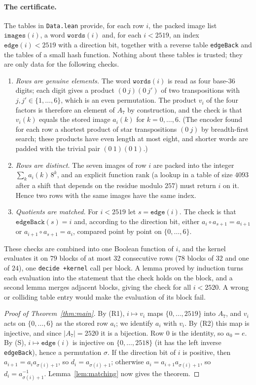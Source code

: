 \documentclass[11pt]{article}
\theoremstyle{definition}
\theoremstyle{remark}
\newcommand{\Alt}{A_7}
\begin{document}
\paragraph{The certificate.}
The tables in \texttt{Data.lean} provide, for each row $i$, the packed image
list $\mathtt{images}(i)$, a word $\mathtt{words}(i)$ and, for each $i<2519$,
an index $\mathtt{edge}(i)<2519$ with a direction bit, together with a reverse
table \texttt{edgeBack} and the tables of a small hash function. Nothing about
these tables is trusted; they are only data for the following checks.
\begin{enumerate}
\item[(R1)] \emph{Rows are genuine elements.} The word $\mathtt{words}(i)$ is
read as four base-$36$ digits; each digit gives a product
$(0\ j)(0\ j')$ of two transpositions with $j,j'\in\{1,\dots,6\}$, which is
an even permutation. The product $v_i$ of the four factors is therefore an
element of $\Alt$ by construction, and the check is that $v_i(k)$ equals the
stored image $a_i(k)$ for $k=0,\dots,6$. (The encoder found for each row a
shortest product of star transpositions $(0\ j)$ by breadth-first search;
these products have even length at most eight, and shorter words are padded
with the trivial pair $(0\ 1)(0\ 1)$.)
\item[(R2)] \emph{Rows are distinct.} The seven images of row $i$ are packed
into the integer $\sum_k a_i(k)\,8^k$, and an explicit function
$\mathrm{rank}$ (a lookup in a table of size $4093$ after a shift that depends
on the residue modulo $257$) must return $i$ on it. Hence two rows with the
same images have the same index.
\item[(S)] \emph{Quotients are matched.} For $i<2519$ let $s=\mathtt{edge}(i)$.
The check is that $\mathtt{edgeBack}(s)=i$ and, according to the direction
bit, either $a_i\circ a_{s+1}=a_{i+1}$ or $a_{i+1}\circ a_{s+1}=a_i$, compared
point by point on $\{0,\dots,6\}$.
\end{enumerate}
These checks are combined into one Boolean function of $i$, and the kernel
evaluates it on $79$ blocks of at most $32$ consecutive rows
($78$ blocks of $32$ and one of $24$), one \texttt{decide +kernel} call per
block. A lemma proved by induction turns each evaluation into the statement
that the check holds on the block, and a second lemma merges adjacent blocks,
giving the check for all $i<2520$. A wrong or colliding table entry would make
the evaluation of its block fail.

\begin{proof}[Proof of Theorem~\ref{thm:main}]
By (R1), $i\mapsto v_i$ maps $\{0,\dots,2519\}$ into $\Alt$, and $v_i$ acts
on $\{0,\dots,6\}$ as the stored row $a_i$; we identify $a_i$ with $v_i$. By
(R2) this map is injective, and since $|\Alt|=2520$ it is a bijection. Row $0$
is the identity, so $a_0=e$. By (S), $i\mapsto\mathtt{edge}(i)$ is injective
on $\{0,\dots,2518\}$ (it has the left inverse \texttt{edgeBack}), hence a
permutation $\sigma$. If the direction bit of $i$ is positive, then
$a_{i+1}=a_i a_{\sigma(i)+1}$, so $d_i=a_{\sigma(i)+1}$; otherwise
$a_i=a_{i+1}a_{\sigma(i)+1}$, so $d_i=a_{\sigma(i)+1}^{-1}$. Lemma~\ref{lem:matching}
now gives the theorem.
\end{proof}
\end{document}
